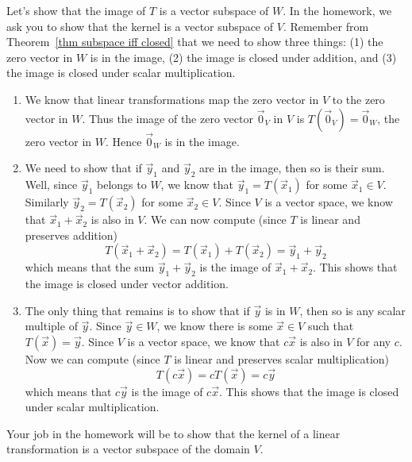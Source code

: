 \begin{example}
Let's show that the image of $T$ is a vector subspace of $W$. In the homework, we ask you to show that the kernel is a vector subspace of $V$.  Remember from Theorem~\ref{thm subspace iff closed} that we need to show three things: (1) the zero vector in $W$ is in the image, (2) the image is closed under addition, and (3) the image is closed under scalar multiplication.
\begin{enumerate}
	\item We know that linear transformations map the zero vector in $V$ to the zero vector in $W$.  Thus the image of the zero vector $\vec 0_V$ in $V$ is $T(\vec 0_V) = \vec 0_W$, the zero vector in $W$.  Hence $\vec 0_W$ is in the image.
	\item We need to show that if $\vec y_1$ and $\vec y_2$ are in the image, then so is their sum.  
	Well, since $\vec y_1$ belongs to $W$, we know that $\vec y_1 = T(\vec x_1)$ for some $\vec x_1\in V$.  
	Similarly $\vec y_2 = T(\vec x_2)$ for some $\vec x_2\in V$.  Since $V$ is a vector space, we know that $\vec x_1+\vec x_2$ is also in $V$.
	We can now compute (since $T$ is linear and preserves addition)   $$T(\vec x_1+\vec x_2) = T(\vec x_1)+T(\vec x_2) = \vec y_1+\vec y_2$$ 
	which means that the sum $\vec y_1+\vec y_2$ is the image of $\vec x_1+\vec x_2$. 
	This shows that the image is closed under vector addition.
	\item The only thing that remains is to show that if $\vec y$ is in $W$, then so is any scalar multiple of $\vec y$. Since $\vec y\in W$, we know there is some $\vec x\in V$ such that $T(\vec x)=\vec y$. Since $V$ is a vector space, we know that $c\vec x$ is also in $V$ for any $c$.  Now we can compute (since $T$ is linear and preserves scalar multiplication) 
	$$T(c\vec x) = cT(\vec x) = c\vec y$$ which means that $c\vec y$ is the image of $c\vec x$.
	This shows that the image is closed under scalar multiplication.
	
\end{enumerate}

Your job in the homework will be to show that the kernel of a linear transformation is a vector subspace of the domain $V$.

\end{example}

